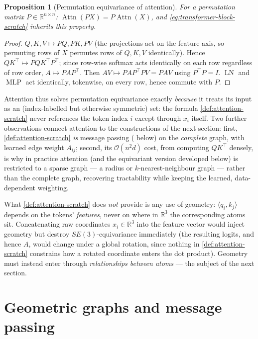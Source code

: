 \documentclass[11pt,a4paper]{report}
\newtheorem{proposition}[proposition]{Proposition}
\theoremstyle{definition}
\theoremstyle{remark}
\DeclareMathOperator{\Attn}{Attn}
\DeclareMathOperator{\LN}{LN}
\DeclareMathOperator{\MLP}{MLP}
\newcommand{\RR}{\mathbb R}
\begin{document}
\begin{proposition}[Permutation equivariance of attention]
\label{prop:perm-equivariance-scratch}
For a permutation matrix $P\in\RR^{n\times n}$: $\Attn(PX)=P\Attn(X)$, and
\eqref{eq:transformer-block-scratch} inherits this property.
\end{proposition}

\begin{proof}
$Q,K,V\mapsto PQ,PK,PV$ (the projections act on the feature axis, so
permuting rows of $X$ permutes rows of $Q,K,V$ identically). Hence
$QK^\top\mapsto PQK^\top P^\top$; since row-wise softmax acts identically on
each row regardless of row order, $A\mapsto PAP^\top$. Then
$AV\mapsto PAP^\top PV = PAV$ using $P^\top P=I$. $\LN$ and $\MLP$ act
identically, tokenwise, on every row, hence commute with $P$.
\end{proof}

Attention thus solves permutation equivariance exactly \emph{because} it
treats its input as an (index-labelled but otherwise symmetric) set: the
formula \eqref{def:attention-scratch} never references the token index $i$
except through $x_i$ itself. Two further observations connect attention to
the constructions of the next section: first, \eqref{def:attention-scratch}
\emph{is} message passing ( below) on the
\emph{complete} graph, with learned edge weight $A_{ij}$; second, its
$\mathcal O(n^2d)$ cost, from computing $QK^\top$ densely, is why in
practice attention (and the equivariant version developed below) is
restricted to a sparse graph --- a radius or $k$-nearest-neighbour graph ---
rather than the complete graph, recovering tractability while keeping the
learned, data-dependent weighting.

What \eqref{def:attention-scratch} does \emph{not} provide is any use of
geometry: $\langle q_i,k_j\rangle$ depends on the tokens' \emph{features},
never on where in $\RR^3$ the corresponding atoms sit. Concatenating raw
coordinates $x_i\in\RR^3$ into the feature vector would inject geometry but
destroy $SE(3)$-equivariance immediately (the resulting logits, and hence
$A$, would change under a global rotation, since nothing in
\eqref{def:attention-scratch} constrains how a rotated coordinate enters
the dot product). Geometry must instead enter through
\emph{relationships between atoms} --- the subject of the next section.

\section{Geometric graphs and message passing}
\label{sec:gnn-scratch}
\end{document}

